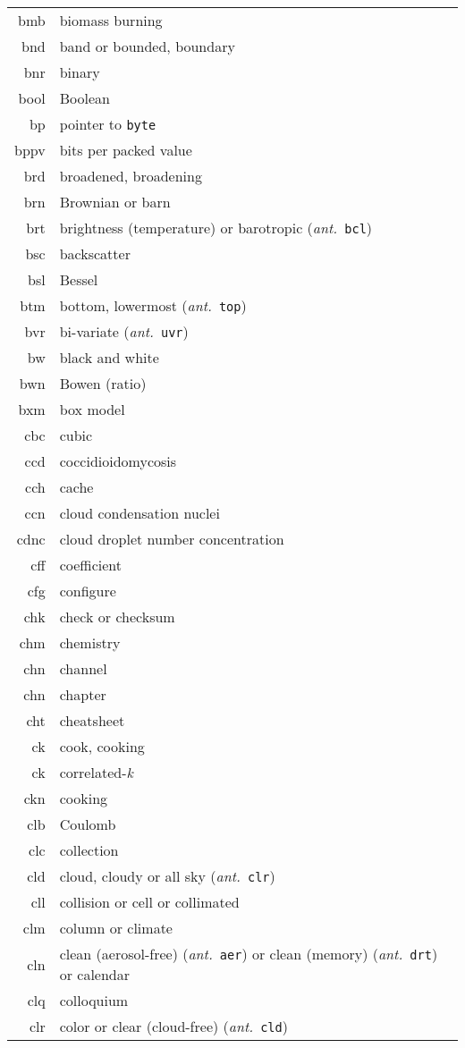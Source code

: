 \documentclass[12pt,twoside]{article}
\newcommand{\ant}[1]{(\textit{ant.}~\texttt{#1})}
\begin{document}
\begin{longtable}[>{\bfseries}l]{>{\ttfamily}r l}
bmb & biomass burning \\
bnd & band or bounded, boundary \\
bnr & binary \\
bool & Boolean\\
bp & pointer to \texttt{byte} \\
bppv & bits per packed value \\
brd & broadened, broadening \\
brn & Brownian or barn \\
brt & brightness (temperature) or barotropic \ant{bcl} \\
bsc & backscatter \\
bsl & Bessel \\
btm & bottom, lowermost \ant{top} \\
bvr & bi-variate \ant{uvr} \\
bw & black and white \\
bwn & Bowen (ratio) \\
bxm & box model \\
cbc & cubic \\
ccd & coccidioidomycosis \\
cch & cache \\
ccn & cloud condensation nuclei \\
cdnc & cloud droplet number concentration \\
cff & coefficient \\
cfg & configure \\
chk & check or checksum \\
chm & chemistry \\
chn & channel \\
chn & chapter \\
cht & cheatsheet \\
ck & cook, cooking \\
ck & correlated-{\textit k} \\
ckn & cooking \\
clb & Coulomb \\
clc & collection \\
cld & cloud, cloudy or all sky \ant{clr} \\
cll & collision or cell or collimated \\
clm & column or climate \\
cln & clean (aerosol-free) \ant{aer} or clean (memory) \ant{drt} or calendar \\
clq & colloquium \\
clr & color or clear (cloud-free) \ant{cld} \\

\end{longtable}
\end{document}
